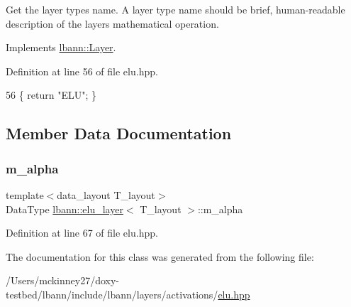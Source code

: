 Get the layer type\textquotesingle{}s name. A layer type name should be brief, human-\/readable description of the layer\textquotesingle{}s mathematical operation. 

Implements \hyperlink{classlbann_1_1Layer_a0fa0ea9160b490c151c0a17fde4f7239}{lbann\+::\+Layer}.



Definition at line 56 of file elu.\+hpp.


\begin{DoxyCode}
56 \{ \textcolor{keywordflow}{return} \textcolor{stringliteral}{"ELU"}; \}
\end{DoxyCode}


\subsection{Member Data Documentation}
\mbox{\label{classlbann_1_1elu__layer_aaeb8ac055d22365a6f387c01f11db93d}} 
\subsubsection{\texorpdfstring{m\+\_\+alpha}{m\_alpha}}
{\footnotesize\ttfamily template$<$data\+\_\+layout T\+\_\+layout$>$ \\
Data\+Type \hyperlink{classlbann_1_1elu__layer}{lbann\+::elu\+\_\+layer}$<$ T\+\_\+layout $>$\+::m\+\_\+alpha\hspace{0.3cm}{\ttfamily [private]}}



Definition at line 67 of file elu.\+hpp.



The documentation for this class was generated from the following file\+:\begin{DoxyCompactItemize}
\item 
/\+Users/mckinney27/doxy-\/testbed/lbann/include/lbann/layers/activations/\hyperlink{elu_8hpp}{elu.\+hpp}\end{DoxyCompactItemize}

